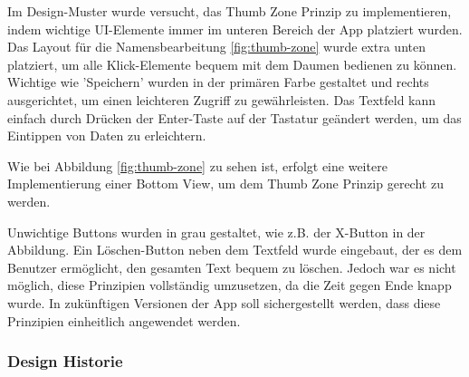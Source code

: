 Im Design-Muster wurde versucht, das Thumb Zone Prinzip zu
implementieren, indem wichtige UI-Elemente immer im unteren
Bereich der App platziert wurden. Das Layout für die
Namensbearbeitung \ref{fig:thumb-zone} wurde extra
unten platziert, um alle Klick-Elemente bequem mit dem
Daumen bedienen zu können. Wichtige
wie 'Speichern'
wurden in der primären Farbe gestaltet und rechts
ausgerichtet, um einen leichteren Zugriff zu gewährleisten.
Das Textfeld kann einfach durch Drücken der Enter-Taste auf
der Tastatur geändert werden, um das Eintippen von Daten zu
erleichtern.

Wie bei Abbildung \ref{fig:thumb-zone} zu sehen ist, erfolgt eine weitere Implementierung einer Bottom View, um dem Thumb Zone Prinzip gerecht zu werden.

Unwichtige Buttons wurden in grau gestaltet, wie z.B. der X-Button in der Abbildung. Ein Löschen-Button neben dem Textfeld wurde eingebaut, der es dem Benutzer ermöglicht, den gesamten Text bequem zu löschen. Jedoch war es nicht möglich, diese Prinzipien vollständig umzusetzen, da die Zeit gegen Ende knapp wurde. In zukünftigen Versionen der App soll sichergestellt werden, dass diese Prinzipien einheitlich angewendet werden.
\subsubsection{Design Historie}

